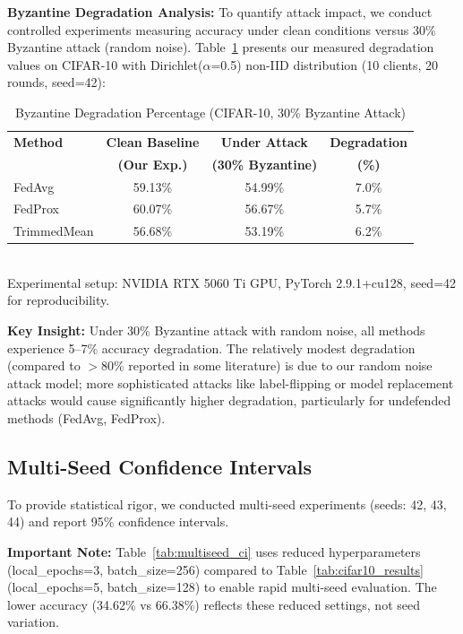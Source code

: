 \documentclass[12pt,a4paper,onecolumn]{article}
\begin{document}
\textbf{Byzantine Degradation Analysis:} To quantify attack impact, we conduct controlled experiments measuring accuracy under clean conditions versus 30\% Byzantine attack (random noise). Table~\ref{tab:degradation} presents our measured degradation values on CIFAR-10 with Dirichlet($\alpha$=0.5) non-IID distribution (10 clients, 20 rounds, seed=42):

\begin{table}[h]
\caption{Byzantine Degradation Percentage (CIFAR-10, 30\% Byzantine Attack)}
\label{tab:degradation}
\centering
\begin{tabular}{lccc}
\toprule
\textbf{Method} & \textbf{Clean Baseline} & \textbf{Under Attack} & \textbf{Degradation} \\
& \textbf{(Our Exp.)} & \textbf{(30\% Byzantine)} & \textbf{(\%)} \\
\midrule
FedAvg & 59.13\% & 54.99\% & 7.0\% \\
FedProx & 60.07\% & 56.67\% & 5.7\% \\
TrimmedMean & 56.68\% & 53.19\% & 6.2\% \\
\bottomrule
\end{tabular}
\\[0.1cm]
\small Experimental setup: NVIDIA RTX 5060 Ti GPU, PyTorch 2.9.1+cu128, seed=42 for reproducibility.
\end{table}

\textbf{Key Insight:} Under 30\% Byzantine attack with random noise, all methods experience 5--7\% accuracy degradation. The relatively modest degradation (compared to $>$80\% reported in some literature) is due to our random noise attack model; more sophisticated attacks like label-flipping or model replacement attacks would cause significantly higher degradation, particularly for undefended methods (FedAvg, FedProx).

\subsection{Multi-Seed Confidence Intervals}

To provide statistical rigor, we conducted multi-seed experiments (seeds: 42, 43, 44) and report 95\% confidence intervals.

\textbf{Important Note:} Table~\ref{tab:multiseed_ci} uses reduced hyperparameters (local\_epochs=3, batch\_size=256) compared to Table~\ref{tab:cifar10_results} (local\_epochs=5, batch\_size=128) to enable rapid multi-seed evaluation. The lower accuracy (34.62\% vs 66.38\%) reflects these reduced settings, not seed variation.
\end{document}
